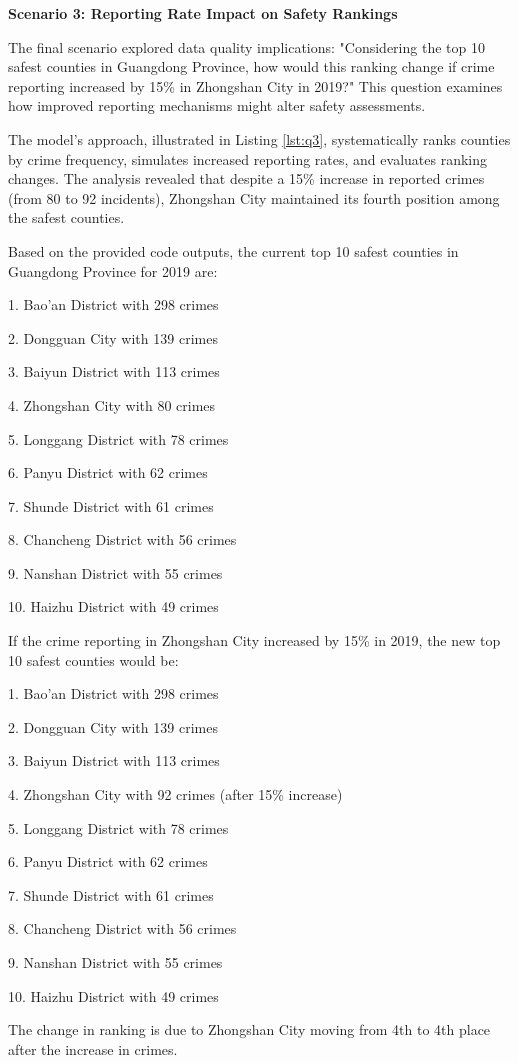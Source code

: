 \noindent \textbf{Scenario 3: Reporting Rate Impact on Safety Rankings}

The final scenario explored data quality implications: "Considering the top 10 safest counties in Guangdong Province, how would this ranking change if crime reporting increased by 15\% in Zhongshan City in 2019?" This question examines how improved reporting mechanisms might alter safety assessments.

The model's approach, illustrated in Listing \ref{lst:q3}, systematically ranks counties by crime frequency, simulates increased reporting rates, and evaluates ranking changes. The analysis revealed that despite a 15\% increase in reported crimes (from 80 to 92 incidents), Zhongshan City maintained its fourth position among the safest counties.



\begin{tcolorbox}[colback=white!95!black, colframe=black, title=Q3 Response, fontupper=\scriptsize, boxsep=2pt, left=3pt, right=3pt]
  Based on the provided code outputs, the current top 10 safest counties in Guangdong Province for 2019 are:

  1. Bao'an District with 298 crimes

  2. Dongguan City with 139 crimes
  
  3. Baiyun District with 113 crimes
  
  4. Zhongshan City with 80 crimes
  
  5. Longgang District with 78 crimes
  
  6. Panyu District with 62 crimes
  
  7. Shunde District with 61 crimes
  
  8. Chancheng District with 56 crimes
  
  9. Nanshan District with 55 crimes
  
  10. Haizhu District with 49 crimes

  If the crime reporting in Zhongshan City increased by 15\% in 2019, the new top 10 safest counties would be:

  1. Bao'an District with 298 crimes

  2. Dongguan City with 139 crimes

  3. Baiyun District with 113 crimes

  4. Zhongshan City with 92 crimes (after 15\% increase)

  5. Longgang District with 78 crimes

  6. Panyu District with 62 crimes

  7. Shunde District with 61 crimes

  8. Chancheng District with 56 crimes

  9. Nanshan District with 55 crimes

  10. Haizhu District with 49 crimes

  The change in ranking is due to Zhongshan City moving from 4th to 4th place after the increase in crimes.
\end{tcolorbox}

